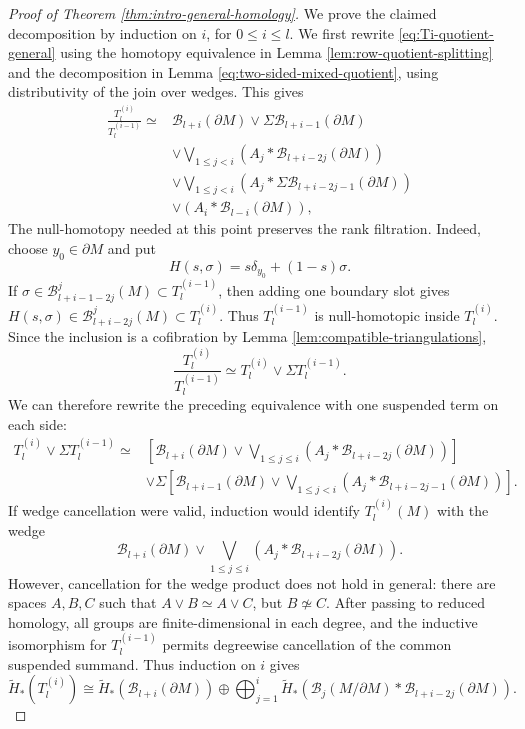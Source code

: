 \documentclass[10pt,a4paper]{amsart}
\newcommand{\BB}{\mathcal B}
\newcommand{\pa}{\partial}
\newcommand{\wt}{\widetilde}
\begin{document}
\begin{proof}[Proof of Theorem \ref{thm:intro-general-homology}]
We prove the claimed decomposition by induction on \(i\), for
\(0\le i\le l\).
We first rewrite \eqref{eq:Ti-quotient-general} using the homotopy equivalence in Lemma \ref{lem:row-quotient-splitting} and the decomposition in Lemma \ref{eq:two-sided-mixed-quotient}, using distributivity of the join over wedges. This gives
\begin{equation}\label{eq:Ti-quotient-expanded}
\begin{aligned}
\frac{T_l^{(i)}}
     {T_l^{(i-1)}}
\simeq {}&
\BB_{l+i}(\pa M)
\vee
\Sigma\BB_{l+i-1}(\pa M)
\\
&\vee
\bigvee_{1\leq j<i}
\left(
A_j*\BB_{l+i-2j}(\pa M)
\right)
\\
&\vee
\bigvee_{1\leq j<i}
\left(
A_j*\Sigma\BB_{l+i-2j-1}(\pa M)
\right)
\\
&\vee
\left(
A_i*\BB_{l-i}(\pa M)
\right),
\end{aligned}
\end{equation}
The null-homotopy needed at this point preserves the rank filtration.
Indeed, choose \(y_0\in\pa M\) and put
\[
H(s,\sigma)=s\delta_{y_0}+(1-s)\sigma .
\]
If \(\sigma\in\BB_{l+i-1-2j}^{j}(M)\subset T_l^{(i-1)}\), then adding
one boundary slot gives
\(H(s,\sigma)\in\BB_{l+i-2j}^{j}(M)\subset T_l^{(i)}\).
Thus \(T_l^{(i-1)}\) is null-homotopic inside \(T_l^{(i)}\). Since the
inclusion is a cofibration by Lemma \ref{lem:compatible-triangulations},
\[
\frac{T_l^{(i)}}{T_l^{(i-1)}}\simeq
T_l^{(i)}\vee\Sigma T_l^{(i-1)}.
\]
We can therefore rewrite the preceding equivalence with one suspended term
on each side:
\begin{equation}\label{eq:Ti-quotient-regrouped}
\begin{aligned}
 T_l^{(i)}\vee\Sigma T_l^{(i-1)}\simeq {}&
\left[
\BB_{l+i}(\pa M)
\vee
\bigvee_{1\leq j\leq i}
\left(
A_j*\BB_{l+i-2j}(\pa M)
\right)
\right]
\\
&\vee
\Sigma
\left[
\BB_{l+i-1}(\pa M)
\vee
\bigvee_{1\leq j<i}
\left(
A_j*\BB_{l+i-2j-1}(\pa M)
\right)
\right].
\end{aligned}
\end{equation}
If wedge cancellation were valid, induction would identify $T_l^{(i)}(M)$ with the wedge
\begin{equation}\label{splitformula}\BB_{l+i}(\pa M)
\vee
\bigvee_{1\leq j\leq i}
\left(
A_j*\BB_{l+i-2j}(\pa M)
\right)
.\end{equation}
However, cancellation for the wedge product does not hold in general: there are spaces $A,B,C$ such that $A\vee B\simeq A\vee C$, but $B\not\simeq C$. After passing to reduced homology, all groups are finite-dimensional in each degree, and the inductive isomorphism for $T_l^{(i-1)}$ permits degreewise cancellation of the common suspended summand. Thus induction on $i$ gives
\begin{equation}\label{eq:Ti-homology-final}
\wt H_*(T_l^{(i)})
\cong
\wt H_*(\BB_{l+i}(\pa M))
\oplus
\bigoplus_{j=1}^{i}
\wt H_*(\BB_j(M/\pa M)*\BB_{l+i-2j}(\pa M)).
\end{equation}


\end{proof}
\end{document}
